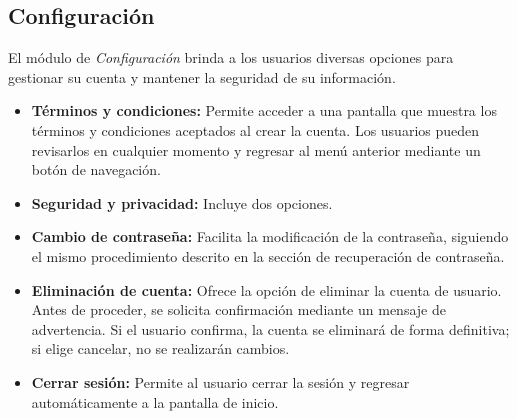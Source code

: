 \documentclass[a4paper,12pt]{article}
\begin{document}
    \subsection{Configuración}
    \par El módulo de \textit{Configuración} brinda a los usuarios diversas opciones para gestionar su cuenta y mantener la seguridad de su información.
    \begin{itemize}
        \item \textbf{Términos y condiciones:} Permite acceder a una pantalla que muestra los términos y condiciones aceptados al crear la cuenta. Los usuarios pueden revisarlos en cualquier momento y regresar al menú anterior mediante un botón de navegación.
        \item \textbf{Seguridad y privacidad:} Incluye dos opciones.
        \item \textbf{Cambio de contraseña:} Facilita la modificación de la contraseña, siguiendo el mismo procedimiento descrito en la sección de recuperación de contraseña.
        \item \textbf{Eliminación de cuenta:} Ofrece la opción de eliminar la cuenta de usuario. Antes de proceder, se solicita confirmación mediante un mensaje de advertencia. Si el usuario confirma, la cuenta se eliminará de forma definitiva; si elige cancelar, no se realizarán cambios.
        \item \textbf{Cerrar sesión:} Permite al usuario cerrar la sesión y regresar automáticamente a la pantalla de inicio.
    \end{itemize}
\end{document}
